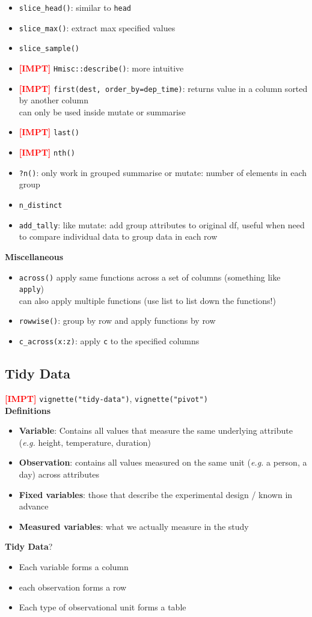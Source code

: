 \documentclass{article}
\newcommand{\eg}[0]{\textit{e.g. }}
\newcommand{\impt}[0]{\textcolor{red}{\textbf{[IMPT] }}}
\begin{document}
\begin{multicols}{2}
\begin{itemize}
	\item \texttt{slice\_head()}: similar to \texttt{head}
	\item \texttt{slice\_max()}: extract max specified values
	\item \texttt{slice\_sample()}
	\item \impt \texttt{Hmisc::describe()}: more intuitive
	\item \impt \texttt{first(dest, order\_by=dep\_time)}: returns value in a column sorted by another column\\
	can only be used inside mutate or summarise
	\item \impt \texttt{last()}
	\item \impt \texttt{nth()}
	\item \texttt{?n()}: only work in grouped summarise or mutate: number of elements in each group
	\item \texttt{n\_distinct}
	\item \texttt{add\_tally}: like mutate: add group attributes to original df, useful when need to compare individual data to group data in each row
\end{itemize}
\textbf{Miscellaneous}
\begin{itemize}
	\item \texttt{across()} apply same functions across a set of columns (something like \texttt{apply})\\
	can also apply multiple functions (use list to list down the functions!)
	\item \texttt{rowwise()}: group by row and apply functions by row
	\item \texttt{c\_across(x:z)}: apply \texttt{c} to the specified columns
\end{itemize}
\subsection{Tidy Data}
\impt \texttt{vignette("tidy-data")}, \texttt{vignette("pivot")}\\
\textbf{Definitions}
\begin{itemize}
	\item \textbf{Variable}: Contains all values that measure the same underlying attribute (\eg height, temperature, duration)
	\item \textbf{Observation}: contains all values measured on the same unit (\eg a person, a day) across attributes
	\item \textbf{Fixed variables}: those that describe the experimental design / known in advance
	\item \textbf{Measured variables}: what we actually measure in the study
\end{itemize}
\textbf{Tidy Data}?
\begin{itemize}
	\item Each variable forms a column
	\item each observation forms a row
	\item Each type of observational unit forms a table
\end{itemize}

\end{multicols}
\end{document}
